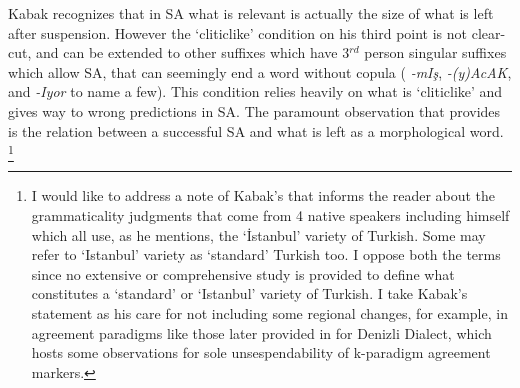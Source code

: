 Kabak recognizes that in SA what is relevant is actually the size of what is left after suspension. However the `cliticlike' condition on his third point is not clear-cut, and can be extended to other suffixes which have 3$^{rd}$ person singular suffixes which allow SA, that can seemingly end a word without copula ( \textit{-mIş}, \textit{-(y)AcAK}, and \textit{-Iyor} to name a few). This condition relies heavily on what is `cliticlike' and gives way to wrong predictions in SA. The paramount observation that \cite{kabak2007turkish} provides is the relation between a successful SA and what is left as a morphological word. \footnote{I would like to address a note of Kabak's that informs the reader about the grammaticality judgments that come from 4 native speakers including himself which all use, as he mentions, the `İstanbul' variety of Turkish. Some may refer to `Istanbul' variety as `standard' Turkish too. I oppose both the terms since no extensive or comprehensive study is provided to define what constitutes a `standard' or `Istanbul' variety of Turkish. I take Kabak's statement as his care for not including some regional changes, for example, in agreement paradigms like those later provided in \cite{saug2013verbal} for Denizli Dialect, which hosts some observations for sole unsespendability of k-paradigm agreement markers.}